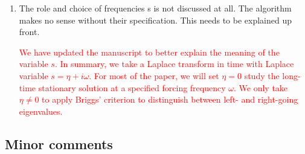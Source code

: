 \documentclass{article}
\newcommand{\response}[1]{\textcolor{red}{#1}}
\begin{document}
\begin{enumerate}
    \item The role and choice of frequencies s is not discussed at all. The algorithm makes no sense without their specification. This needs to be explained up front.

    \response{We have updated the manuscript to better explain the meaning of the variable $s$. In summary, we take a Laplace transform in time with Laplace variable $s=\eta+i\omega$. For most of the paper, we will set $\eta=0$ study the long-time stationary solution at a specified forcing frequency $\omega$. We only take $\eta\neq0$ to apply Briggs' criterion to distinguish between left- and right-going eigenvalues.}
\end{enumerate}


\subsection*{Minor comments}
\end{document}
